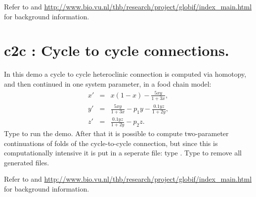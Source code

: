 \documentclass[12pt]{report}
\begin{document}
Refer to  \citeyear{DoKoVoKu08} and 
\url{http://www.bio.vu.nl/thb/research/project/globif/index_main.html}
for background information.

%
\section{ c2c : Cycle to cycle connections.} \label{sec:Demos_c2c}

In this demo a cycle to cycle heteroclinic connection is computed via
homotopy, and then continued in one system parameter, in a food chain model:
\begin{eqnarray*}
    x' &=& x(1 - x) - \frac{5 x y}{1 + 3 x}, \\
    y' &=& \frac{5 x y}{1 + 3 x}  - p_1 y - \frac{0.1 y z}{1 + 2 y}, \\
    z' &=& \frac{0.1 y z}{1 + 2 y} - p_2 z. \end{eqnarray*}
Type  to run the demo.
After that it is possible to compute two-parameter continuations of
folds of the cycle-to-cycle
connection, but since this is computationally intensive it is put in
a seperate file: type .
Type  to remove all generated files.

Refer to  \citeyear{DoKoVoKu09} and 
\url{http://www.bio.vu.nl/thb/research/project/globif/index_main.html}
for background information.

\newpage
\end{document}
